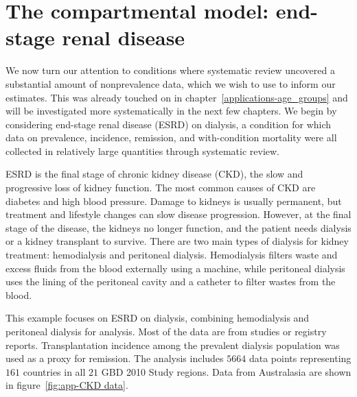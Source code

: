 \chapter{The compartmental model: end-stage renal disease}
\label{applications-fits_incon_v_con}

We now turn our attention to conditions where systematic review
uncovered a substantial amount of nonprevalence data, which we wish
to use to inform our estimates.  This was already touched on in
chapter~\ref{applications-age_groups} and will be investigated more
systematically in the next few chapters.  We begin by considering
end-stage renal disease (ESRD) on dialysis, a condition for which data on
prevalence, incidence, remission, and with-condition mortality were
all collected in relatively large quantities through systematic
review.

ESRD is the final stage of chronic kidney disease (CKD), the slow and
progressive loss of kidney function.  The most common causes of CKD
are diabetes and high blood pressure.  Damage to kidneys is usually
permanent, but treatment and lifestyle changes can slow disease progression.  However, at the final stage of the disease, the kidneys no longer function,
and the patient needs dialysis or a kidney transplant to survive.
There are two main types of
dialysis for kidney treatment: hemodialysis and peritoneal dialysis.
Hemodialysis filters waste and excess fluids from the blood
externally using a machine, while peritoneal dialysis uses the lining
of the peritoneal cavity and a catheter to filter wastes from the
blood. \cite{_k/doqi_2002, dipiro_pharmacotherapy:_2008}

This example focuses on ESRD on dialysis, combining hemodialysis
and peritoneal dialysis for analysis.
Most of the data are from studies or registry reports.
Transplantation incidence among the prevalent
dialysis population was used as a proxy for remission.  The analysis
includes $5664$ data points representing $161$ countries in
all $21$ GBD 2010 Study regions.  Data from Australasia are shown in
figure~\ref{fig:app-CKD data}.


